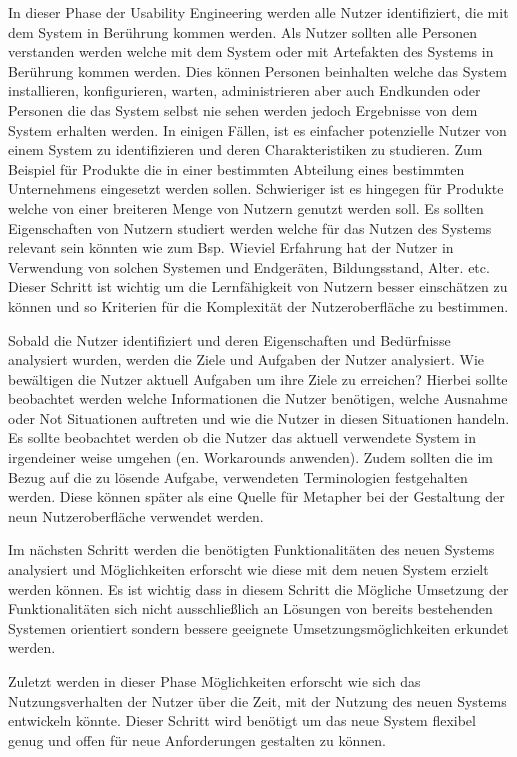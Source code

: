In dieser Phase der Usability Engineering werden alle Nutzer identifiziert, die mit dem System in Berührung kommen werden. Als Nutzer sollten alle Personen verstanden werden welche mit dem 
System oder mit Artefakten des Systems in Berührung kommen werden. Dies können Personen beinhalten welche das System installieren, konfigurieren, warten, administrieren aber auch Endkunden oder 
Personen die das System selbst nie sehen werden jedoch Ergebnisse von dem System erhalten werden. In einigen Fällen, ist es einfacher potenzielle Nutzer von einem System zu identifizieren und deren 
Charakteristiken zu studieren. Zum Beispiel für Produkte die in einer bestimmten Abteilung eines bestimmten Unternehmens eingesetzt werden sollen. Schwieriger ist es hingegen für Produkte 
welche von einer breiteren Menge von Nutzern genutzt werden soll. Es sollten Eigenschaften von Nutzern studiert werden welche für das Nutzen des Systems relevant sein könnten wie zum Bsp. 
Wieviel Erfahrung  hat der Nutzer in Verwendung von solchen Systemen und Endgeräten, Bildungsstand, Alter. etc. Dieser Schritt ist wichtig um die Lernfähigkeit von Nutzern besser einschätzen zu 
können und so Kriterien für die Komplexität der Nutzeroberfläche zu bestimmen.

Sobald die Nutzer identifiziert und deren Eigenschaften und Bedürfnisse analysiert wurden, werden die Ziele und Aufgaben der Nutzer analysiert. Wie bewältigen die Nutzer aktuell Aufgaben um 
ihre Ziele zu erreichen? Hierbei sollte beobachtet werden welche Informationen die Nutzer benötigen, welche Ausnahme oder Not Situationen auftreten und wie die Nutzer in diesen Situationen handeln. 
Es sollte beobachtet werden ob die Nutzer das aktuell verwendete System in irgendeiner weise umgehen (en. Workarounds anwenden). Zudem sollten die im Bezug auf die zu lösende Aufgabe, verwendeten 
Terminologien festgehalten werden. Diese können später als eine Quelle für Metapher bei der Gestaltung der neun Nutzeroberfläche verwendet werden. 

Im nächsten Schritt werden die benötigten Funktionalitäten des neuen Systems analysiert und Möglichkeiten erforscht wie diese mit dem neuen System erzielt werden können. 
Es ist wichtig dass in diesem Schritt die Mögliche Umsetzung der Funktionalitäten sich nicht ausschließlich an Lösungen von bereits bestehenden Systemen orientiert sondern 
bessere geeignete Umsetzungsmöglichkeiten erkundet werden.

Zuletzt werden in dieser Phase Möglichkeiten erforscht wie sich das Nutzungsverhalten der Nutzer über die Zeit, mit der Nutzung des neuen Systems entwickeln könnte. Dieser Schritt wird  
benötigt um das neue System flexibel genug und offen für neue Anforderungen gestalten zu können. %

